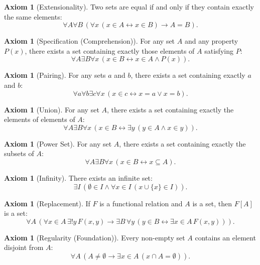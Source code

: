 \documentclass[12pt,a4paper]{article}
\theoremstyle{definition}
\newtheorem{axiom}[theorem]{Axiom}
\theoremstyle{remark}
\begin{document}
\begin{axiom}[Extensionality]
Two sets are equal if and only if they contain exactly the same elements:
\[
\forall A \forall B \, (\forall x \, (x \in A \leftrightarrow x \in B) \rightarrow A = B).
\]
\end{axiom}

\begin{axiom}[Specification (Comprehension)]
For any set $A$ and any property $P(x)$, there exists a set containing exactly those elements of $A$ satisfying $P$:
\[
\forall A \exists B \forall x \, (x \in B \leftrightarrow x \in A \land P(x)).
\]
\end{axiom}

\begin{axiom}[Pairing]
For any sets $a$ and $b$, there exists a set containing exactly $a$ and $b$:
\[
\forall a \forall b \exists c \forall x \, (x \in c \leftrightarrow x = a \lor x = b).
\]
\end{axiom}

\begin{axiom}[Union]
For any set $A$, there exists a set containing exactly the elements of elements of $A$:
\[
\forall A \exists B \forall x \, (x \in B \leftrightarrow \exists y \, (y \in A \land x \in y)).
\]
\end{axiom}

\begin{axiom}[Power Set]
For any set $A$, there exists a set containing exactly the subsets of $A$:
\[
\forall A \exists B \forall x \, (x \in B \leftrightarrow x \subseteq A).
\]
\end{axiom}

\begin{axiom}[Infinity]
There exists an infinite set:
\[
\exists I \, (\emptyset \in I \land \forall x \in I \, (x \cup \{x\} \in I)).
\]
\end{axiom}

\begin{axiom}[Replacement]
If $F$ is a functional relation and $A$ is a set, then $F[A]$ is a set:
\[
\forall A \, (\forall x \in A \, \exists! y \, F(x,y) \rightarrow \exists B \, \forall y \, (y \in B \leftrightarrow \exists x \in A \, F(x,y))).
\]
\end{axiom}

\begin{axiom}[Regularity (Foundation)]
Every non-empty set $A$ contains an element disjoint from $A$:
\[
\forall A \, (A \neq \emptyset \rightarrow \exists x \in A \, (x \cap A = \emptyset)).
\]
\end{axiom}
\end{document}
